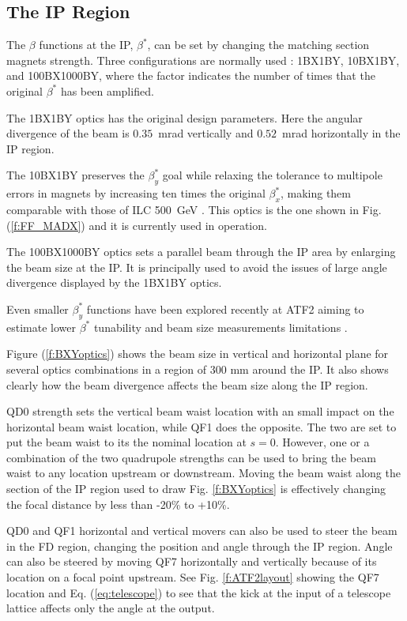{{\subsection{The IP Region}\label{s:opticsIP}
The $\beta$ functions at the IP, $\beta^*$, can be set by changing the matching section magnets strength. Three configurations are normally used : 1BX1BY, 10BX1BY, and 100BX1000BY, where the factor indicates the number of times that the original $\beta^*$ has been amplified.\par
The 1BX1BY optics has the original design parameters. Here the angular divergence of the beam is $0.35$~mrad vertically and $0.52$~mrad horizontally in the IP region. \par
The 10BX1BY preserves the $\beta_y^*$ goal while relaxing the tolerance to multipole errors in magnets by increasing ten times the original $\beta_x^*$, making them comparable with those of ILC 500~GeV \cite{PhysRevSTAB.17.023501}. This optics is the one shown in Fig. (\ref{f:FF_MADX}) and it is currently used in operation.\par
The 100BX1000BY optics sets a parallel beam through the IP area by enlarging the beam size at the IP. It is principally used to avoid the issues of large angle divergence displayed by the 1BX1BY optics.\par
Even smaller $\beta_y^*$ functions have been explored recently at ATF2 aiming to estimate lower $\beta^*$ tunability and beam size measurements limitations \cite{PateckiLowBeta}.\par
Figure (\ref{f:BXYoptics}) shows the beam size in vertical and horizontal plane for several optics combinations in a region of 300 mm around the IP. It also shows clearly how the beam divergence affects the beam size along the IP region.\par 
QD0 strength sets the vertical beam waist location with an small impact on the horizontal beam waist location, while QF1 does the opposite. The two are set to put the beam waist to its the nominal location at $s=0$. However, one or a combination of the two quadrupole strengths can be used to bring the beam waist to any location upstream or downstream. Moving the beam waist along the section of the IP region used to draw Fig. \ref{f:BXYoptics} is effectively changing the focal distance by less than -20\% to +10\%.\par
QD0 and QF1 horizontal and vertical movers can also be used to steer the beam in the FD region, changing the position and angle through the IP region. Angle can also be steered by moving QF7 horizontally and vertically because of its location on a focal point upstream. See Fig. \ref{f:ATF2layout} showing the QF7 location and Eq. (\ref{eq:telescope}) to see that the kick at the input of a telescope lattice affects only the angle at the output.\par
}}
